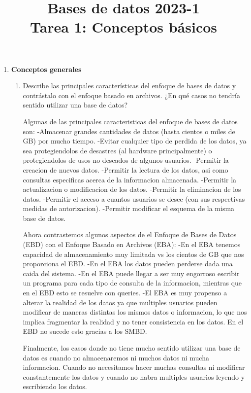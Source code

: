\documentclass[12pt,a4paper]{article}
\title{Bases de datos 2023-1\\
Tarea 1: Conceptos básicos}
\begin{document}
\maketitle

\begin{enumerate}
	\item \textbf{Conceptos generales}
		\begin{enumerate}
			\item Describe las principales características del enfoque de bases de datos y contrástalo con el enfoque
				basado en archivos. ¿En qué casos no tendría sentido utilizar una base de datos?
				
				Algunas de las principales caracteristicas del enfoque de bases de datos son:
				-Almacenar grandes cantidades de datos (hasta cientos o miles de GB) por mucho tiempo.
				-Evitar cualquier tipo de perdida de los datos, ya sea protegiendolos de desastres (al hardware principalmente) o 
				 protegiendolos de usos no deseados de algunos usuarios.
				-Permitir la creacion de nuevos datos.
				-Permitir la lectura de los datos, asi como consultas especificas acerca de la informacion almacenada.
				-Permitir la actualizacion o modificacion de los datos.
				-Permitir la eliminacion de los datos.
				-Permitir el acceso a cuantos usuarios se desee (con sus respectivas medidas de autorizacion).
				-Permitir modificar el esquema de la misma base de datos.

				Ahora contrastemos algunos aspectos de el Enfoque de Bases de Datos (EBD) con el Enfoque Basado en Archivos (EBA):
				-En el EBA tenemos capacidad de almacenamiento muy limitada vs los cientos de GB que nos proporciona el EBD.
				-En el EBA los datos pueden perderse dada una caida del sistema.
				-En el EBA puede llegar a ser muy engorroso escribir un programa para cada tipo de consulta de la informacion, mientras
				 que en el EBD esto se resuelve con queries.
				-El EBA es muy propenso a alterar la realidad de los datos ya que multiples usuarios pueden modificar de maneras distintas 
				 los mismos datos o informacion, lo que nos implica fragmentar la realidad y no tener consistencia en los datos. En el EBD 
				 no sucede esto gracias a los SMBD.

				Finalmente, los casos donde no tiene mucho sentido utilizar una base de datos es cuando no almacenaremos ni muchos datos 
				ni mucha informacion. Cuando no necesitamos hacer muchas consultas ni modificar constantemente los datos y cuando no habra
				multiples usuarios leyendo y escribiendo los datos.
				

\end{enumerate}
\end{enumerate}
\end{document}
